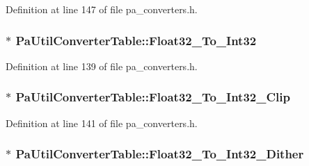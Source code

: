 Definition at line 147 of file pa\+\_\+converters.\+h.

\subsubsection[{\texorpdfstring{Float32\+\_\+\+To\+\_\+\+Int32}{Float32_To_Int32}}]{$\ast$ Pa\+Util\+Converter\+Table\+::\+Float32\+\_\+\+To\+\_\+\+Int32}\hypertarget{struct_pa_util_converter_table_a64701b747f08157a7e51eb167c2984bf}{}\label{struct_pa_util_converter_table_a64701b747f08157a7e51eb167c2984bf}


Definition at line 139 of file pa\+\_\+converters.\+h.

\subsubsection[{\texorpdfstring{Float32\+\_\+\+To\+\_\+\+Int32\+\_\+\+Clip}{Float32_To_Int32_Clip}}]{$\ast$ Pa\+Util\+Converter\+Table\+::\+Float32\+\_\+\+To\+\_\+\+Int32\+\_\+\+Clip}\hypertarget{struct_pa_util_converter_table_a8fc5021de2523d81f2b4e01b0cf3bb87}{}\label{struct_pa_util_converter_table_a8fc5021de2523d81f2b4e01b0cf3bb87}


Definition at line 141 of file pa\+\_\+converters.\+h.

\subsubsection[{\texorpdfstring{Float32\+\_\+\+To\+\_\+\+Int32\+\_\+\+Dither}{Float32_To_Int32_Dither}}]{$\ast$ Pa\+Util\+Converter\+Table\+::\+Float32\+\_\+\+To\+\_\+\+Int32\+\_\+\+Dither}\hypertarget{struct_pa_util_converter_table_a6ce00388d960201d8bcdf1e0fe04c1e7}{}\label{struct_pa_util_converter_table_a6ce00388d960201d8bcdf1e0fe04c1e7}


